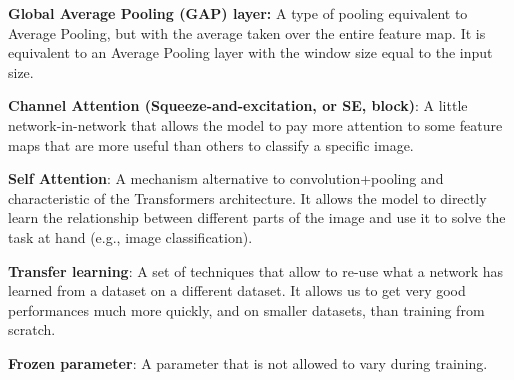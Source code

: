 \textbf{Global Average Pooling (GAP) layer:} A type of pooling equivalent to Average Pooling, but with the average taken over the entire feature map. It is equivalent to an Average Pooling layer with the window size equal to the input size. \newline

\textbf{Channel Attention (Squeeze-and-excitation, or SE, block)}: A little network-in-network that allows the model to pay more attention to some feature maps that are more useful than others to classify a specific image. \newline

\textbf{Self Attention}: A mechanism alternative to convolution+pooling and characteristic of the Transformers architecture. It allows the model to directly learn the relationship between different parts of the image and use it to solve the task at hand (e.g., image classification). \newline

\textbf{Transfer learning}: A set of techniques that allow to re-use what a network has learned from a dataset on a different dataset. It allows us to get very good performances much more quickly, and on smaller datasets, than training from scratch. \newline

\textbf{Frozen parameter}: A parameter that is not allowed to vary during training.
